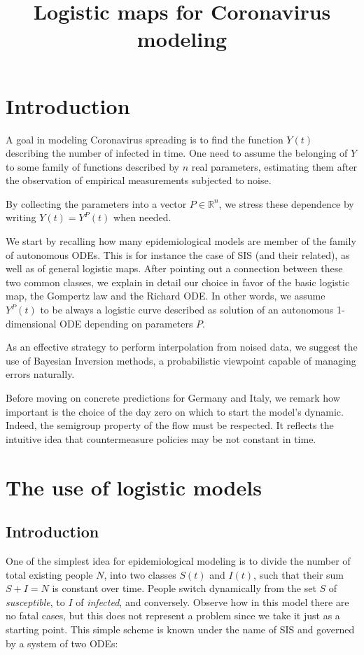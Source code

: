 \documentclass[9pt]{article}
\title {Logistic maps for Coronavirus modeling}
\begin{document}
\maketitle
\section{Introduction}
A goal in modeling Coronavirus spreading is to find the function
$Y(t)$ describing the number of infected in time.
One need to assume the belonging of $Y$ to some family of functions
described by $n$ real parameters, estimating them after the observation
of empirical measurements subjected to noise.


By collecting the parameters into a vector $P \in \mathbb{R}^n$, 
we stress these dependence by writing $Y(t) = Y^P(t)$ when needed.


We start by recalling how many epidemiological models are member of 
the family of autonomous ODEs. This is for instance the case of
SIS (and their related), as well as of general logistic maps.
After pointing out a connection between these two common classes,
we explain in detail our choice in favor of the basic logistic map,
the Gompertz
law and the Richard ODE. In other words,
we assume $Y^P(t)$ to be always a logistic
curve described as solution of an autonomous 1-dimensional ODE 
depending on parameters $P$.


As an effective strategy to perform interpolation from noised data,
we suggest the use of Bayesian Inversion methods, 
a probabilistic viewpoint capable of managing errors naturally.


Before moving on concrete predictions for Germany and Italy,
we remark how important is the choice of the day zero on which to start
the model's dynamic. Indeed, the semigroup property of the flow
must be respected. It reflects the intuitive idea that countermeasure
policies may be not constant in time.

\section {The use of logistic models}
\subsection {Introduction}
One of the simplest idea for epidemiological modeling is to divide the
number of total existing people $N$, 
into two classes $S(t)$ and $I(t)$, such that
their sum $S + I = N$ is constant over time. People switch dynamically from
the set $S$ of \emph{susceptible}, to $I$ of \emph{infected}, and
conversely. Observe how in this model there are no fatal cases,
but this does not represent a problem since we take it just as a
starting point.
This simple scheme is known under the name of SIS and
governed by a system of two ODEs:
\end{document}
